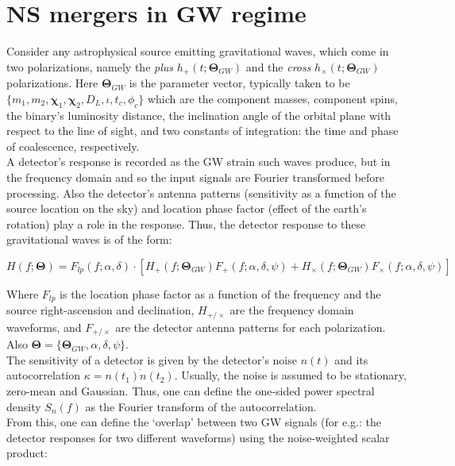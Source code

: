 \section{NS mergers in GW regime}
    \label{sec:ns_in_gw}

    Consider any astrophysical source emitting gravitational waves, which come in two
    polarizations, namely the \emph{plus} $h_{+}(t; \mathbf{\Theta}_{GW})$ and the
    \emph{cross} $h_{\times}(t; \mathbf{\Theta}_{GW})$ polarizations. Here
    $\mathbf{\Theta}_{GW}$ is the parameter vector, typically taken to be $\{m_1, m_2,
    \mathbf{\chi}_1, \mathbf{\chi}_2, D_L, \iota, t_c, \phi_c\}$ which are the component
    masses, component spins, the binary's luminosity distance, the inclination angle
    of the orbital plane with respect to the line of sight, and two constants of
    integration: the time and phase of coalescence, respectively.\\
    A detector's response is recorded as the GW strain such waves produce, but in the
    frequency domain and so the input signals are Fourier transformed before processing.
    Also the detector's antenna patterns (sensitivity as a function of the source
    location on the sky) and location phase factor (effect of the earth's rotation) play
    a role in the response. Thus, the detector response to these gravitational waves is
    of the form:

    \begin{equation}
        H(f; \mathbf{\Theta}) =
            F_{lp}(f; \alpha, \delta) \cdot
            [
                H_{+}(f; \mathbf{\Theta}_{GW}) F_{+}(f; \alpha, \delta, \psi) +
                H_{\times}(f; \mathbf{\Theta}_{GW}) F_{\times}(f; \alpha, \delta, \psi)
            ]
    \end{equation}

    Where $F_{lp}$ is the location phase factor as a function of the frequency and the
    source right-ascension and declination, $H_{+/\times}$ are the frequency domain
    waveforms, and $F_{+/\times}$ are the detector antenna patterns for each
    polarization. Also $\mathbf{\Theta} = \{\mathbf{\Theta}_{GW}, \alpha, \delta,
    \psi\}$.\\ The sensitivity of a detector is given by the detector's noise $n(t)$ and
    its autocorrelation $\kappa = \overline{n(t_1)n(t_2)}$. Usually, the noise is
    assumed to be stationary, zero-mean and Gaussian. Thus, one can define the one-sided
    power spectral density $S_n(f)$ as the Fourier transform of the autocorrelation.\\
    From this, one can define the `overlap' between two GW signals (for e.g.: the
    detector responses for two different waveforms) using the noise-weighted scalar
    product:

